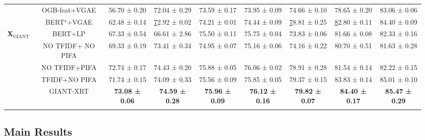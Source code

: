 \documentclass{article} \usepackage{iclr2022_conference,times}
\begin{document}
\begin{table}[t!]
\begin{tabular}{@{}cccccc|ccc@{}}
 &
  OGB-feat+VGAE &
  56.70 ± 0.20 &
  72.04 ± 0.29 &
  73.59 ± 0.17 &
  73.95 ± 0.09 &
  74.66 ± 0.10 &
  78.65 ± 0.20 &
  83.06 ± 0.06 \\
 &
  BERT$^\star$+VGAE &
  62.48 ± 0.14 &
  {\ul 72.92 ± 0.02} &
  74.21 ± 0.01 &
  74.44 ± 0.09 &
  {\ul 78.81 ± 0.25} &
  {\ul 82.80 ± 0.11} &
  84.40 ± 0.09 \\ \midrule
\multicolumn{1}{l}{\multirow{5}{*}{$\mathbf{X}_{\text{GIANT}}$}} &
  BERT+LP &
  67.33 ± 0.54 &
  66.61 ± 2.86 &
  75.50 ± 0.11 &
  75.75 ± 0.04 &
  73.83 ± 0.06 &
  81.66 ± 0.08 &
  82.33 ± 0.16 \\ \cmidrule(l){2-9} 
\multicolumn{1}{l}{} &
  NO TFIDF+ NO PIFA &
  69.33 ± 0.19 &
  73.41 ± 0.34 &
  74.95 ± 0.07 &
  75.16 ± 0.06 &
  74.16 ± 0.22 &
  80.70 ± 0.51 &
  81.63 ± 0.28 \\
\multicolumn{1}{l}{} &
  NO TFIDF+PIFA &
  72.74 ± 0.17 &
  74.43 ± 0.20 &
  75.88 ± 0.05 &
  76.06 ± 0.02 &
  78.91 ± 0.28 &
  81.54 ± 0.14 &
  82.22 ± 0.15 \\
\multicolumn{1}{l}{} &
  TFIDF+NO PIFA &
  71.74 ± 0.15 &
  74.09 ± 0.33 &
  75.56 ± 0.09 &
  75.85 ± 0.05 &
  79.37 ± 0.15 &
  83.83 ± 0.14 &
  85.01 ± 0.10 \\
\multicolumn{1}{l}{} &
  GIANT-XRT &
  \textbf{73.08 ± 0.06} &
  \textbf{74.59 ± 0.28} &
  \textbf{75.96 ± 0.09} &
  \textbf{76.12 ± 0.16} &
  \textbf{79.82 ± 0.07} &
  \textbf{84.40 ± 0.17} &
  \textbf{85.47 ± 0.29} \\
  \bottomrule
  \vspace{-2em}
\end{tabular}


\vspace{-0.2cm}
\end{table}


\subsection{Main Results}
\end{document}

